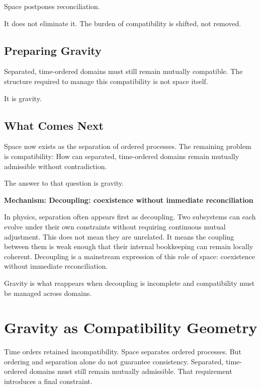 \documentclass[11pt,twoside,openright]{book}
\newenvironment{mechanismbox}[1]
  {\begin{framed}\noindent\textbf{Mechanism: #1}\par\medskip}
  {\end{framed}}
\begin{document}
Space postpones reconciliation.

It does not eliminate it. The burden of compatibility is shifted, not removed.

\section*{Preparing Gravity}

Separated, time-ordered domains must still remain mutually compatible. The structure required to manage this compatibility is not space itself.

It is gravity.

\section*{What Comes Next}

Space now exists as the separation of ordered processes. The remaining problem is compatibility: How can separated, time-ordered domains remain mutually admissible without contradiction.

The answer to that question is gravity.

\begin{mechanismbox}{Decoupling: coexistence without immediate reconciliation}

In physics, separation often appears first as decoupling. Two subsystems can each evolve under their own constraints without requiring continuous mutual adjustment. This does not mean they are unrelated. It means the coupling between them is weak enough that their internal bookkeeping can remain locally coherent. Decoupling is a mainstream expression of this role of space: coexistence without immediate reconciliation.

Gravity is what reappears when decoupling is incomplete and compatibility must be managed across domains.

\end{mechanismbox}

\chapter{Gravity as Compatibility Geometry}

Time orders retained incompatibility. Space separates ordered processes. But ordering and separation alone do not guarantee consistency. Separated, time-ordered domains must still remain mutually admissible. That requirement introduces a final constraint.
\end{document}
